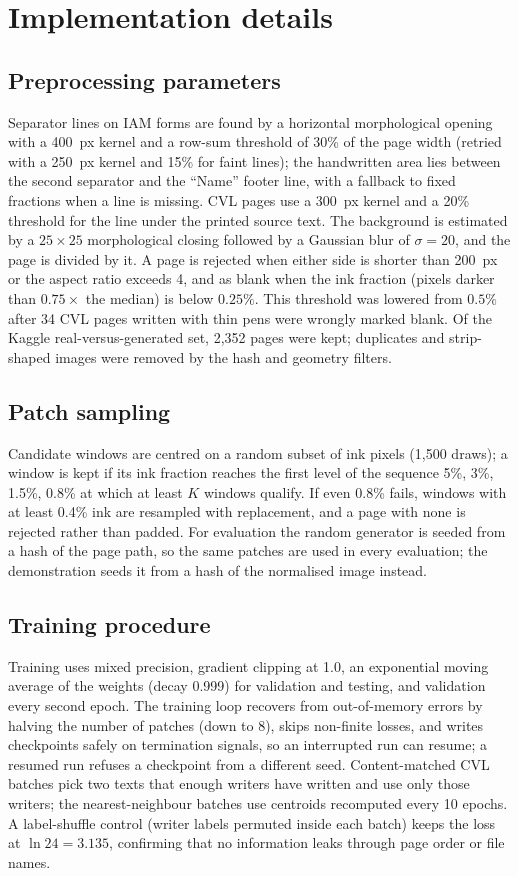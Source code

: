 \section{Implementation details}
\label{app:impl}
\subsection{Preprocessing parameters}
Separator lines on IAM forms are found by a horizontal morphological opening with a 400~px kernel and a row-sum threshold of 30\% of the page width (retried with a 250~px kernel and 15\% for faint lines); the handwritten area lies between the second separator and the ``Name'' footer line, with a fallback to fixed fractions when a line is missing.
CVL pages use a 300~px kernel and a 20\% threshold for the line under the printed source text.
The background is estimated by a $25\times25$ morphological closing followed by a Gaussian blur of $\sigma=20$, and the page is divided by it.
A page is rejected when either side is shorter than 200~px or the aspect ratio exceeds 4, and as blank when the ink fraction (pixels darker than $0.75\times$ the median) is below $0.25\%$.
This threshold was lowered from $0.5\%$ after 34 CVL pages written with thin pens were wrongly marked blank.
Of the Kaggle real-versus-generated set, 2,352 pages were kept; duplicates and strip-shaped images were removed by the hash and geometry filters.

\subsection{Patch sampling}
Candidate windows are centred on a random subset of ink pixels (1,500 draws); a window is kept if its ink fraction reaches the first level of the sequence 5\%, 3\%, 1.5\%, 0.8\% at which at least $K$ windows qualify.
If even 0.8\% fails, windows with at least 0.4\% ink are resampled with replacement, and a page with none is rejected rather than padded.
For evaluation the random generator is seeded from a hash of the page path, so the same patches are used in every evaluation; the demonstration seeds it from a hash of the normalised image instead.

\subsection{Training procedure}
Training uses mixed precision, gradient clipping at 1.0, an exponential moving average of the weights (decay 0.999) for validation and testing, and validation every second epoch.
The training loop recovers from out-of-memory errors by halving the number of patches (down to 8), skips non-finite losses, and writes checkpoints safely on termination signals, so an interrupted run can resume; a resumed run refuses a checkpoint from a different seed.
Content-matched CVL batches pick two texts that enough writers have written and use only those writers; the nearest-neighbour batches use centroids recomputed every 10 epochs.
A label-shuffle control (writer labels permuted inside each batch) keeps the loss at $\ln 24=3.135$, confirming that no information leaks through page order or file names.

